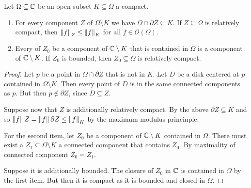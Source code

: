 \begin{lema}
    Let $\Omega \subseteq \mathbb{C}$ be an open subset $K \subseteq \Omega$ a compact.
    \begin{enumerate}
        \item For every component $Z$ of $\Omega \setminus K$ we have $\Omega \cap \partial{Z} \subseteq K$. If $Z \subseteq \Omega$ is relatively compact, then $\left\lVert f\right\rVert_Z \leq \left\lVert f\right\rVert_K$ for all $f \in \mathcal{O}(\Omega)$.
        \item Every of $Z_0$ be a component of $\mathbb{C} \setminus K$ that is contained in $\Omega$ is a component of $\mathbb{C} \setminus K$. If $Z_0$ is bounded, then $Z_0 \subseteq \Omega$ is relatively compact.
    \end{enumerate}
\end{lema}
\begin{proof}
    Let $p$ be a point in $\Omega \cap \partial{Z}$ that is not in $K$. Let $D$ be a disk centered at $p$ contained in $\Omega \setminus K$. Then every point of $D$ is in the same connected components as $p$. But then $p \notin \partial{Z}$, since $D \subseteq Z$.

    Suppose now that $Z$ is additionally relatively compact. By the above $\partial{Z} \subseteq K$ and so $\left\lVert f\right\rVert Z = \left\lVert f\right\rVert{\partial{Z}}\leq \left\lVert f\right\rVert_K$ by the maximum modulus princinple.

    For the second item, let $Z_0$ be a component of $\mathbb{C} \setminus K$ contained in $\Omega$. There must exist a $Z_1 \subseteq \Omega \setminus K$ a connected component that contains $Z_0$. By maximality of connected component $Z_0 = Z_1$.

    Suppose it is additionally bounded. The closure of $Z_0$ in $\mathbb{C}$ is contained in $\Omega$ by the first item. But then it is compact as it is bounded and closed in $\Omega$.
\end{proof}

